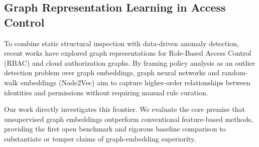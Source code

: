 \subsection{Graph Representation Learning in Access Control}
To combine static structural inspection with data-driven anomaly detection, recent works have explored graph representations for Role-Based Access Control (RBAC) and cloud authorization graphs. By framing policy analysis as an outlier detection problem over graph embeddings, graph neural networks and random-walk embeddings (Node2Vec) aim to capture higher-order relationships between identities and permissions without requiring manual rule curation. 

Our work directly investigates this frontier. We evaluate the core premise that unsupervised graph embeddings outperform conventional feature-based methods, providing the first open benchmark and rigorous baseline comparison to substantiate or temper claims of graph-embedding superiority.

